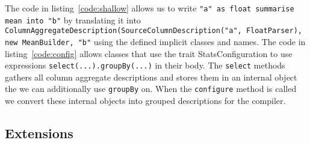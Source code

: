 The code in listing~\ref{code:shallow} allows us to write \texttt{"a" as float summarise mean into "b"} by translating it into \texttt{ColumnAggregateDescription(SourceColumnDescription("a", FloatParser), new MeanBuilder, "b"} using the defined implicit classes and names. The code in listing~\ref{code:config} allows classes that use the trait StatsConfiguration to use expressions \texttt{select(...).groupBy(...)} in their body. The \texttt{select} methods gathers all column aggregate descriptions and stores them in an internal object the we can additionally use \texttt{groupBy} on. When the \texttt{configure} method is called we convert these internal objects into grouped descriptions for the compiler.

\subsection{Extensions}


